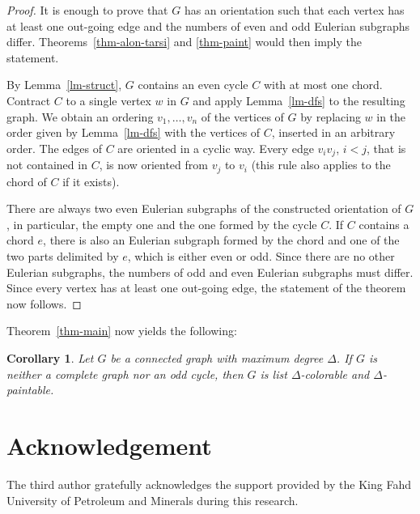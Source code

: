 \documentclass[10pt]{article}
\newtheorem{corollary}[theorem]{Corollary}
\begin{document}
\begin{proof}
It is enough to prove that $G$ has an orientation such that
each vertex has at least one out-going edge and
the numbers of even and odd Eulerian subgraphs differ.
Theorems~\ref{thm-alon-tarsi} and \ref{thm-paint}
would then imply the statement.

By Lemma~\ref{lm-struct},
$G$ contains an even cycle $C$ with at most one chord.
Contract $C$ to a single vertex $w$ in $G$ and apply Lemma~\ref{lm-dfs} to the resulting graph.
We obtain an ordering $v_1,\ldots,v_n$ of the vertices of $G$ by replacing $w$ in the order
given by Lemma~\ref{lm-dfs} with the vertices of $C$, inserted in an arbitrary order.
The edges of $C$ are oriented in a cyclic way.
Every edge $v_iv_j$, $i<j$,
that is not contained in $C$, is now oriented from $v_j$ to $v_i$ (this rule also applies
to the chord of $C$ if it exists).

There are always two even Eulerian subgraphs of the constructed orientation of $G$,
in particular, the empty one and the one formed by the cycle $C$. If $C$ contains a chord $e$,
there is also an Eulerian subgraph formed by the chord and one of the two parts delimited by $e$,
which is either even or odd. Since there are no other Eulerian subgraphs,
the numbers of odd and even Eulerian subgraphs must differ. Since every vertex has at least
one out-going edge, the statement of the theorem now follows.
\end{proof}

Theorem~\ref{thm-main} now yields the following:

\begin{corollary}
\label{cor-main}
Let $G$ be a connected graph with maximum degree $\Delta$. If $G$ is neither a complete graph nor
an odd cycle, then $G$ is list $\Delta$-colorable and $\Delta$-paintable.
\end{corollary}

\section*{Acknowledgement}

The third author gratefully acknowledges the
support provided by the King Fahd University of Petroleum and
Minerals during this research.
\end{document}
